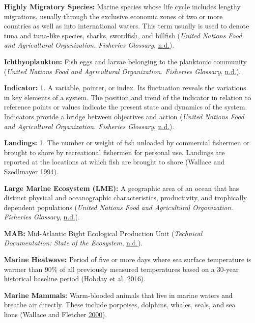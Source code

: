 \documentclass[
]{book}
\begin{document}
\textbf{Highly Migratory Species:}
Marine species whose life cycle includes lengthy migrations, usually through the exclusive economic zones of two or more countries as well as into international waters. This term usually is used to denote tuna and tuna-like species, sharks, swordfish, and billfish (\emph{United Nations Food and Agricultural Organization. Fisheries Glossary}, \protect\hyperlink{ref-unfao}{n.d.}).

\textbf{Ichthyoplankton:}
Fish eggs and larvae belonging to the planktonic community (\emph{United Nations Food and Agricultural Organization. Fisheries Glossary}, \protect\hyperlink{ref-unfao}{n.d.}).

\textbf{Indicator:}
1. A variable, pointer, or index. Its fluctuation reveals the variations in key elements of a system. The position and trend of the indicator in relation to reference points or values indicate the present state and dynamics of the system. Indicators provide a bridge between objectives and action (\emph{United Nations Food and Agricultural Organization. Fisheries Glossary}, \protect\hyperlink{ref-unfao}{n.d.}).

\textbf{Landings:}
1. The number or weight of fish unloaded by commercial fishermen or brought to shore by recreational fishermen for personal use. Landings are reported at the locations at which fish are brought to shore (Wallace and Szedlmayer \protect\hyperlink{ref-wallace1994}{1994}).

\textbf{Large Marine Ecosystem (LME):}
A geographic area of an ocean that has distinct physical and oceanographic characteristics, productivity, and trophically dependent populations (\emph{United Nations Food and Agricultural Organization. Fisheries Glossary}, \protect\hyperlink{ref-unfao}{n.d.}).

\textbf{MAB:}
Mid-Atlantic Bight Ecological Production Unit (\emph{Technical Documentation: State of the Ecosystem}, \protect\hyperlink{ref-techdoc}{n.d.}).

\textbf{Marine Heatwave:}
Period of five or more days where sea surface temperature is warmer than 90\% of all previously measured temperatures based on a 30-year historical baseline period (Hobday et al. \protect\hyperlink{ref-hobday2016}{2016}).

\textbf{Marine Mammals:}
Warm-blooded animals that live in marine waters and breathe air directly. These include porpoises, dolphins, whales, seals, and sea lions (Wallace and Fletcher \protect\hyperlink{ref-wallace2000}{2000}).
\end{document}
